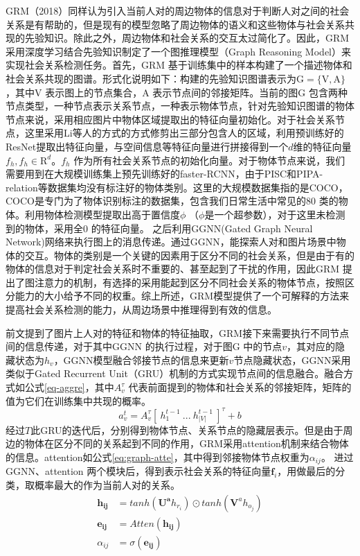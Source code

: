 GRM（2018）\cite{wang2018deep}同样认为引入当前人对的周边物体的信息对于判断人对之间的社会关系是有帮助的，但是现有的模型忽略了周边物体的语义和这些物体与社会关系共现的先验知识。除此之外，周边物体和社会关系的交互太过简化了。因此，GRM 采用深度学习结合先验知识制定了一个图推理模型（Graph Reasoning Model）来实现社会关系检测任务。首先，GRM 基于训练集中的样本构建了一个描述物体和社会关系共现的图谱。形式化说明如下：构建的先验知识图谱表示为$\mathrm{G} = \{\mathrm{V},\mathrm{A}\}$，其中$\mathrm{V}$ 表示图上的节点集合，$\mathrm{A}$ 表示节点间的邻接矩阵。当前的图$\mathrm{G}$ 包含两种节点类型，一种节点表示关系节点，一种表示物体节点，针对先验知识图谱的物体节点来说，采用相应图片中物体区域提取出的特征向量初始化。对于社会关系节点，这里采用Li等人的方式\cite{li2017dual-glance}的方式修剪出三部分包含人的区域，利用预训练好的ResNet提取出特征向量，与空间信息等特征向量进行拼接得到一个$d$维的特征向量$f_{h},f_{h} \in \mathrm{R}^d$。$f_h$ 作为所有社会关系节点的初始化向量。对于物体节点来说，我们需要用到在大规模训练集上预先训练好的faster-RCNN\cite{ren2015faster}，由于PISC和PIPA-relation等数据集均没有标注好的物体类别。这里的大规模数据集指的是COCO\cite{lin2014microsoft}，COCO是专门为了物体识别标注的数据集，包含我们日常生活中常见的80 类的物体。利用物体检测模型提取出高于置信度$\phi$ （$\phi$是一个超参数），对于这里未检测到的物体，采用全$0$ 的特征向量。
之后利用GGNN(Gated Graph Neural Network)网络\cite{li2016gated}来执行图上的消息传递。通过GGNN，能探索人对和图片场景中物体的交互。物体的类别是一个关键的因素用于区分不同的社会关系，但是由于有的物体的信息对于判定社会关系时不重要的、甚至起到了干扰的作用，因此GRM 提出了图注意力的机制，有选择的采用能起到区分不同社会关系的物体节点，按照区分能力的大小给予不同的权重。综上所述，GRM模型提供了一个可解释的方法来提高社会关系检测的能力，从周边场景中推理得到有效的信息。

前文提到了图片上人对的特征和物体的特征抽取，GRM接下来需要执行不同节点间的信息传递，对于其中GGNN 的执行过程，对于图$\mathrm{G}$ 中的节点$v$，其对应的隐藏状态为$h_{v}$，GGNN模型融合邻接节点的信息来更新$v$节点隐藏状态，GGNN采用类似于Gated Recurrent Unit（GRU）\cite{cho2014learning}机制的方式实现节点间的信息融合。融合方式如公式\ref{eq-aggre}，其中$A_v^{\tau}$ 代表前面提到的物体和社会关系的邻接矩阵，矩阵的值为它们在训练集中共现的概率。
\begin{equation}\label{eq-aggre}
    a_v^t = A_{v}^{\tau}[~h_1^{t-1}~...~h_{|V|}^{t-1}~]^{\tau} + b
\end{equation}
经过$T$此GRU的迭代后，分别得到物体节点、关系节点的隐藏层表示。但是由于周边的物体在区分不同的关系起到不同的作用，GRM采用attention机制来结合物体的信息。attention如公式\ref{eq:graph-atte}，其中得到邻接物体节点权重为$\alpha_{ij}$。 进过GGNN、attention 两个模块后，得到表示社会关系的特征向量$\mathbf{f}_{i}$，用做最后的分类，取概率最大的作为当前人对的关系。
\begin{equation}\label{eq:graph-atte}
    \begin{split}
        \mathbf{h_{ij}} &= tanh(\mathbf{U^a}h_{r_{i}}) \odot tanh(\mathbf{V}^ah_{o_{j}}) \\
        \mathbf{e_{ij}} &= Atten(\mathbf{h_{ij}}) \\
        \alpha_{ij} &= \sigma(\mathbf{e_{ij}})
    \end{split}
\end{equation}

